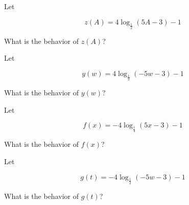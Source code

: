\documentclass{ximera}
\author{Lee Wayand}
\begin{document}
\begin{exercise}


\begin{question}



Let 

\[
z(A) = 4 \log_{\tfrac{1}{2}}(5A - 3) - 1
\]


What is the behavior of $z(A)$? 


\begin{multipleChoice}
\end{multipleChoice}

\end{question}







\begin{question}



Let 

\[
y(w) = 4 \log_{\tfrac{1}{3}}(-5w - 3) - 1
\]


What is the behavior of $y(w)$? 


\begin{multipleChoice}
\end{multipleChoice}

\end{question}





\begin{question}



Let 

\[
f(x) = -4 \log_{\tfrac{1}{4}}(5x - 3) - 1
\]


What is the behavior of $f(x)$? 


\begin{multipleChoice}
\end{multipleChoice}

\end{question}








\begin{question}



Let 

\[
g(t) = -4 \log_{\tfrac{1}{2}}(-5w - 3) - 1
\]


What is the behavior of $g(t)$? 


\begin{multipleChoice}
\end{multipleChoice}

\end{question}








\end{exercise}
\end{document}
